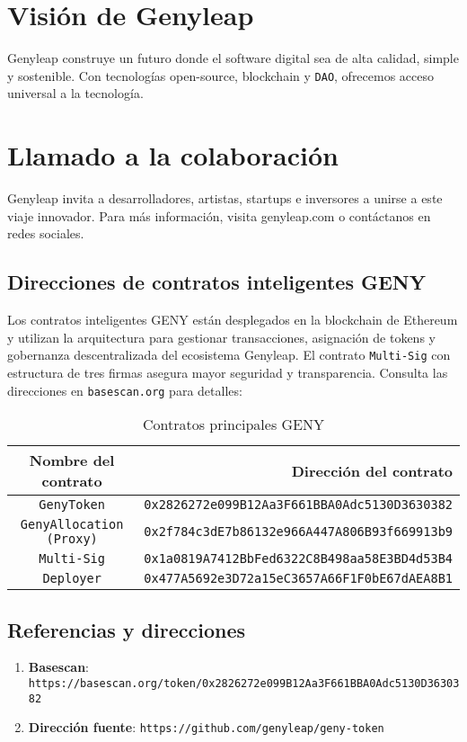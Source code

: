 \documentclass[a4paper,12pt,openany]{book}
\begin{document}
\chapter{Visión de Genyleap}
Genyleap construye un futuro donde el software digital sea de alta calidad, simple y sostenible. Con tecnologías open-source, blockchain y \texttt{DAO}, ofrecemos acceso universal a la tecnología.

\chapter{Llamado a la colaboración}
Genyleap invita a desarrolladores, artistas, startups e inversores a unirse a este viaje innovador. Para más información, visita genyleap.com o contáctanos en redes sociales.

\section*{Direcciones de contratos inteligentes GENY}
Los contratos inteligentes GENY están desplegados en la blockchain de Ethereum y utilizan la arquitectura  para gestionar transacciones, asignación de tokens y gobernanza descentralizada del ecosistema Genyleap. El contrato \texttt{Multi-Sig} con estructura de tres firmas asegura mayor seguridad y transparencia. Consulta las direcciones en \texttt{basescan.org} para detalles:

\begin{table}[h]
\centering
\caption*{Contratos principales GENY}
\small
\begin{tabular}{c r}
\hline
\textbf{Nombre del contrato} & \textbf{Dirección del contrato} \\
\hline
\texttt{GenyToken} & {\texttt{0x2826272e099B12Aa3F661BBA0Adc5130D3630382}} \\
\texttt{GenyAllocation (Proxy)} & {\texttt{0x2f784c3dE7b86132e966A447A806B93f669913b9}} \\
\texttt{Multi-Sig} & {\texttt{0x1a0819A7412BbFed6322C8B498aa58E3BD4d53B4}} \\
\texttt{Deployer} & {\texttt{0x477A5692e3D72a15eC3657A66F1F0bE67dAEA8B1}} \\
\hline
\end{tabular}
\end{table}

\section*{Referencias y direcciones}

\begin{enumerate}
    \item \textbf{Basescan}: \texttt{https://basescan.org/token/0x2826272e099B12Aa3F661BBA0Adc5130D3630382}
    \item \textbf{Dirección fuente}: \texttt{https://github.com/genyleap/geny-token}
\end{enumerate}
\end{document}
